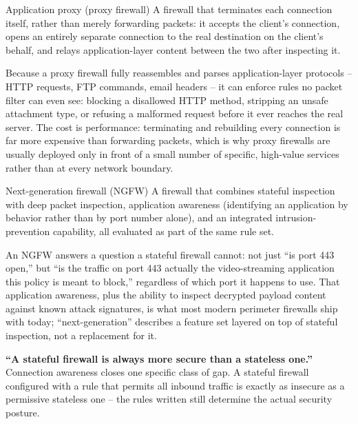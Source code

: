\begin{definition}{Application proxy (proxy firewall)}
A firewall that terminates each connection itself, rather than merely forwarding packets: it accepts
the client's connection, opens an entirely separate connection to the real destination on the
client's behalf, and relays application-layer content between the two after inspecting it.
\end{definition}

Because a proxy firewall fully reassembles and parses application-layer protocols -- HTTP requests,
FTP commands, email headers -- it can enforce rules no packet filter can even see: blocking a
disallowed HTTP method, stripping an unsafe attachment type, or refusing a malformed request before
it ever reaches the real server. The cost is performance: terminating and rebuilding every
connection is far more expensive than forwarding packets, which is why proxy firewalls are usually
deployed only in front of a small number of specific, high-value services rather than at every
network boundary.

\begin{definition}{Next-generation firewall (NGFW)}
A firewall that combines stateful inspection with deep packet inspection, application awareness
(identifying an application by behavior rather than by port number alone), and an integrated
intrusion-prevention capability, all evaluated as part of the same rule set.
\end{definition}

An NGFW answers a question a stateful firewall cannot: not just ``is port 443 open,'' but ``is the
traffic on port 443 actually the video-streaming application this policy is meant to block,''
regardless of which port it happens to use. That application awareness, plus the ability to inspect
decrypted payload content against known attack signatures, is what most modern perimeter firewalls
ship with today; ``next-generation'' describes a feature set layered on top of stateful inspection,
not a replacement for it.

\begin{misconception}
\textbf{``A stateful firewall is always more secure than a stateless one.''} Connection awareness
closes one specific class of gap. A stateful firewall configured with a rule that permits all
inbound traffic is exactly as insecure as a permissive stateless one -- the rules written still
determine the actual security posture.
\end{misconception}

